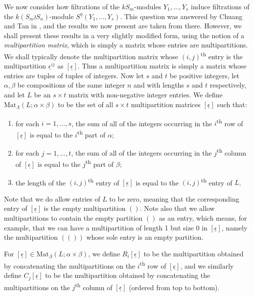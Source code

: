 \documentclass[ALCO,Unicode,published]{cedram}
\newcommand{\tss}[1]{\textsuperscript{#1}}
\newcommand{\ul}[1]{\underline{#1}}
\begin{document}
We now consider how filtrations of the $kS_m$-modules $Y_1,\ldots,Y_s$ induce filtrations of the $k(S_m \wr S_n)$-module
$S^{\ul{\eta}}(Y_1,\ldots,Y_s)$. This question was answered by Chuang and Tan
in \cite{CHTAN}, and the results we now present are taken from there. However, we shall present these results in a very slightly modified
form, using the notion of a \textit{multipartition matrix}, which is simply a matrix whose entries are multipartitions. We shall typically
denote the multipartition matrix whose $(i,j)$\tss{th} entry is the multipartition $\ul{\epsilon}^{ij}$ as $[\ul{\epsilon}]$. Thus a
multipartition matrix is simply a matrix whose entries are tuples of tuples of integers. Now let $s$ and $t$ be positive integers,
let $\alpha,\beta$ be compositions of the same integer $n$ and with lengths $s$ and $t$ respectively, and let $L$ be an $s{\times}t$
matrix with non-negative integer entries. We define $\mathrm{Mat}_{\ul{\Lambda}}(L;\alpha{\times}\beta)$ to be the
set of all $s{\times}t$ multipartition matrices $[\ul{\epsilon}]$ such that:
\begin{enumerate}
\item for each $i=1,\ldots,s$, the sum of all of the integers occurring in the $i$\tss{th} row of $[\ul{\epsilon}]$ is equal to the
$i$\tss{th} part of $\alpha$;
\item for each $j=1,\ldots,t$, the sum of all of the integers occurring in the $j$\tss{th} column of $[\ul{\epsilon}]$ is equal to the
$j$\tss{th} part of $\beta$;
\item the length of the $(i,j)$\tss{th} entry of $[\ul{\epsilon}]$ is equal to the $(i,j)$\tss{th} entry of $L$.
\end{enumerate}
Note that we do allow entries of $L$ to be zero, meaning that the corresponding entry of $[\ul{\epsilon}]$ is the empty multipartition
$()$. Note also that we allow multipartitions to contain the empty partition $()$ as an entry, which means, for example, that we can have
a multipartition of length 1 but size 0 in $[\ul{\epsilon}]$, namely the multipartition $(())$ whose sole entry is an empty partition.

For $[\ul{\epsilon}] \in \mathrm{Mat}_{\ul{\Lambda}}(L;\alpha{\times}\beta)$, we define $R_i[\ul{\epsilon}]$ to be the multipartition
obtained by concatenating the multipartitions on the $i$\tss{th} row of $[\ul{\epsilon}]$, and we similarly define $C_j[\ul{\epsilon}]$
to be the multipartition obtained by concatenating the multipartitions on the $j$\tss{th} column of $[\ul{\epsilon}]$ (ordered from top
to bottom).
\end{document}
